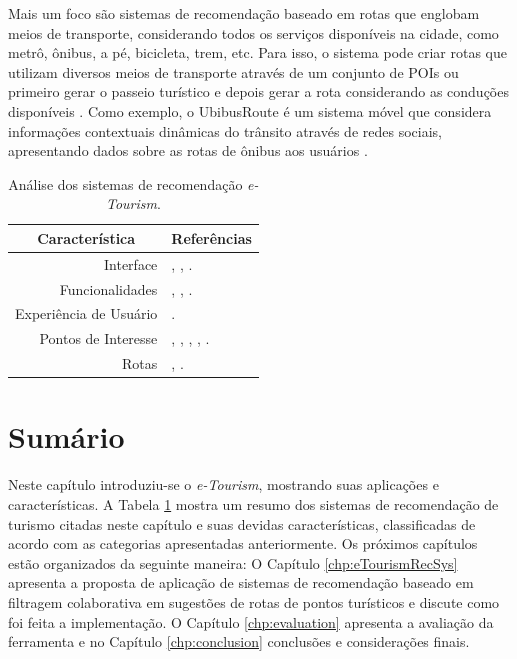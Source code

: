 Mais um foco são sistemas de recomendação baseado em rotas que englobam meios de transporte, considerando todos os serviços disponíveis na cidade, como metrô, ônibus, a pé, bicicleta, trem, etc. Para isso, o sistema pode criar rotas que utilizam diversos meios de transporte através de um conjunto de POIs ou primeiro gerar o passeio turístico e depois gerar a rota considerando as conduções disponíveis \citep{GAVALAS2014319}. Como exemplo, o UbibusRoute é um sistema móvel que considera informações contextuais dinâmicas do trânsito através de redes sociais, apresentando dados sobre as rotas de ônibus aos usuários \citep{lima2012ubibusroute}.

\begin{table}[h!]
    \centering
	\caption{Análise dos sistemas de recomendação \textit{e-Tourism}.}
	\label{tab:analise_tourism_recommender}
	\begin{tabular}{|r|p{11cm}|}
		\hline
		\multicolumn{1}{|c|}{\bfseries Característica} & \multicolumn{1}{|c|}{\bfseries Referências} \\ \hline
		
		Interface & \cite{4669760}, \cite{Baltrunas2012}, \cite{Gavalas2011}. \\ \hline
		Funcionalidades & \cite{article}, \cite{4669760}, \cite{Moura:2013:DUT:2526188.2526215}. \\ \hline
		Experiência de Usuário & \cite{4669760}.	\\ \hline
		Pontos de Interesse & \cite{AAAI159560}, \cite{Ying:2012:UPR:2346496.2346507}, \cite{Ye:2011:EGI:2009916.2009962}, \cite{Gavalas2011}, \cite{Baltrunas2012}. \\ \hline
		Rotas & \cite{lima2012ubibusroute}, \cite{Moura:2013:DUT:2526188.2526215}. \\ \hline

	\end{tabular}
\end{table}

\section{Sumário}
\label{sec:summaryETourism}

Neste capítulo introduziu-se o \textit{e-Tourism}, mostrando suas aplicações e características. A Tabela \ref{tab:analise_tourism_recommender} mostra um resumo dos sistemas de recomendação de turismo citadas neste capítulo e suas devidas características, classificadas de acordo com as categorias apresentadas anteriormente. Os próximos capítulos estão organizados da seguinte maneira: O Capítulo \ref{chp:eTourismRecSys} apresenta a proposta de aplicação de sistemas de recomendação baseado em filtragem colaborativa em sugestões de rotas de pontos turísticos e discute como foi feita a implementação. O Capítulo \ref{chp:evaluation} apresenta a avaliação da ferramenta e no Capítulo \ref{chp:conclusion} conclusões e considerações finais.